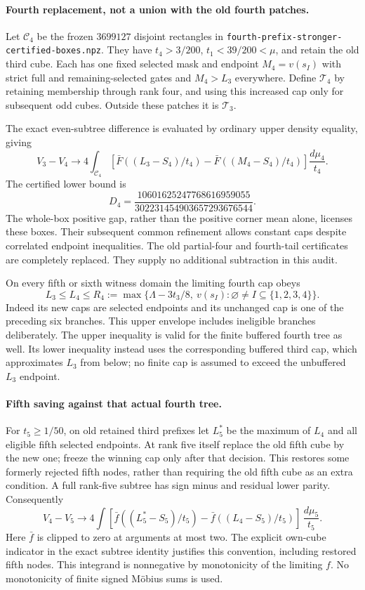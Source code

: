 \paragraph{Fourth replacement, not a union with the old fourth patches.}
Let $\mathcal C_4$ be the frozen $3699127$ disjoint rectangles in
\texttt{fourth-prefix-stronger-certified-boxes.npz}. They have
$t_4>3/200$, $t_1<39/200<\mu$, and retain the old third cube.
Each has one fixed selected mask and endpoint $M_4=v(s_I)$ with
strict full and remaining-selected gates and $M_4>L_3$ everywhere.
Define $\mathcal T_4$ by retaining membership through rank four,
and using this increased cap only for subsequent odd cubes.
Outside these patches it is $\mathcal T_3$.

The exact even-subtree difference is evaluated by ordinary upper
density equality, giving
\[
 V_3-V_4\longrightarrow
 4\int_{\mathcal C_4}
 [\bar F((L_3-S_4)/t_4)-\bar F((M_4-S_4)/t_4)]
 \frac{d\mu_4}{t_4}.
\]
The certified lower bound is
\[
 D_4=\frac{10601625247768616959055}{302231454903657293676544}.
\]
The whole-box positive gap, rather than the positive corner mean
alone, licenses these boxes. Their subsequent common refinement
allows constant caps despite correlated endpoint inequalities.
The old partial-four and fourth-tail certificates are completely
replaced. They supply no additional subtraction in this audit.

On every fifth or sixth witness domain the limiting fourth cap obeys
\[
 L_3\le L_4\le R_4:=
 \max\{\Lambda-3t_3/8,\ v(s_I):
                  \varnothing\ne I\subseteq\{1,2,3,4\}\}.
\]
Indeed its new caps are selected endpoints and its unchanged cap
is one of the preceding six branches.
This upper envelope includes ineligible branches deliberately.
The upper inequality is valid for the finite buffered fourth tree
as well. Its lower inequality instead uses the corresponding
buffered third cap, which approximates $L_3$ from below; no finite
cap is assumed to exceed the unbuffered $L_3$ endpoint.

\paragraph{Fifth saving against that actual fourth tree.}
For $t_5\ge1/50$, on old retained third prefixes let $L_5^*$ be
the maximum of $L_4$ and all eligible fifth selected endpoints.
At rank five itself replace the old fifth cube by the new one;
freeze the winning cap only after that decision. This restores
some formerly rejected fifth nodes, rather than requiring the
old fifth cube as an extra condition. A full rank-five subtree
has sign minus and residual lower parity. Consequently
\[
 V_4-V_5\longrightarrow
 4\int [\bar f((L_5^*-S_5)/t_5)
                -\bar f((L_4-S_5)/t_5)]\,\frac{d\mu_5}{t_5}.
\]
Here $\bar f$ is clipped to zero at arguments at most two.
The explicit own-cube indicator in the exact subtree identity
justifies this convention, including restored fifth nodes.
This integrand is nonnegative by monotonicity of the limiting $f$.
No monotonicity of finite signed M\"obius sums is used.

